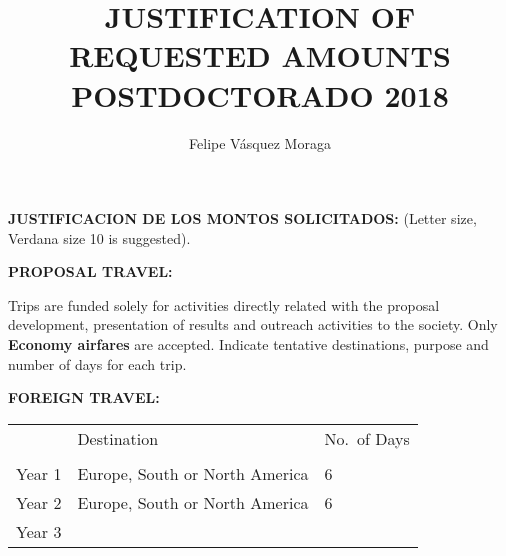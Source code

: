 \documentclass[10pt]{article}
\author{Felipe Vásquez Moraga}
\title{JUSTIFICATION OF REQUESTED AMOUNTS POSTDOCTORADO 2018}
\begin{document}
\noindent \textbf{JUSTIFICACION DE LOS MONTOS SOLICITADOS:}
\vspace{5pt}
\vspace{5pt}
\noindent(Letter size, Verdana size 10 is suggested).



\noindent \textbf{PROPOSAL TRAVEL:}

\noindent Trips are funded solely for activities directly related with the proposal development, presentation of results and outreach activities to the society. Only \textbf{Economy airfares} are accepted. Indicate tentative destinations, purpose and number of days for each trip.

\vspace{15pt}
\noindent\textbf{FOREIGN TRAVEL:}

\vspace{15pt}

\begin{tabular}{l|l|l|}
\cline{2-3}
                             & Destination & No.\ of Days \\ \cline{2-3} 
                             &             &             \\ \hline
\multicolumn{1}{|l|}{Year 1} &      Europe, South or North America       &     6        \\ \hline
\multicolumn{1}{|l|}{Year 2} &       Europe, South or North America      &      6       \\ \hline
\multicolumn{1}{|l|}{Year 3} &            &           \\ \hline
\end{tabular}
\vspace{15pt}

\begin{comment}
\vspace{15pt}
\begin{tabular}{l|l|l|}
\cline{2-3}
                             & Destino & No.\ de dias \\ \cline{2-3} 
                             &             &             \\ \hline
\multicolumn{1}{|l|}{Año 1} &      Europa, Sur- o Norteamerica       &     6        \\ \hline
\multicolumn{1}{|l|}{Año 2} &       Europa, Sur- o Norteamerica       &      6       \\ \hline
\multicolumn{1}{|l|}{Año 3} &            &           \\ \hline
\end{tabular}
\end{comment}
\end{document}
